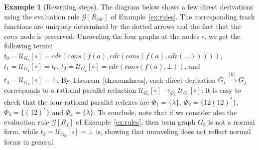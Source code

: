 \documentclass{eptcs}
\theoremstyle{plain}
\theoremstyle{definition}
\newtheorem{example}[theorem]{Example}
\begin{document}
\begin{example}[Rewriting steps]
The diagram below
shows a few direct derivations using the evaluation rule $\mathcal{G}[R_{cdr}]$ of Example~\ref{ex:rules}. The corresponding track functions are uniquely determined by the dotted arrows and the fact that the $cons$ node is preserved. Unraveling the four graphs at the nodes $\circ$, we get the following terms: $t_0= \mathcal{U}_{G_0}[\circ] = cdr(cons(f(a),cdr(cons(f(a),cdr(\ldots)))))$, $t_1 = \mathcal{U}_{G_1}[\circ] = t_0$, $t_2= \mathcal{U}_{G_2}[\circ] = cdr(cons(f(a),\bot))$, and $t_3= \mathcal{U}_{G_3}[\circ] = \bot$. By Theorem~\ref{th:soundness}, each direct derivation $G_i \stackrel{[k]}{\Rightarrow} G_j$  corresponds to a rational parallel reduction $\mathcal{U}_{G_i}[\circ] \to_{\Phi_k} \mathcal{U}_{G_j}[\circ]$: it is easy to check that the four rational parallel redexes are $\Phi_1 = \{\lambda\}$, $\Phi_2 = \{12(12)^*\}$, $\Phi_3 = \{(12)^*\}$ and $\Phi_4 = \{\lambda\}$. 
To conclude, note that if we consider also the evaluation rule $\mathcal{G}[R_f]$ of Example~\ref{ex:rules}, then term graph $G_3$ is not a normal form, while $t_3 =  \mathcal{U}_{G_3}[\circ] = \bot$ is, showing that unraveling does not reflect normal forms in general.
\end{example}
\end{document}
